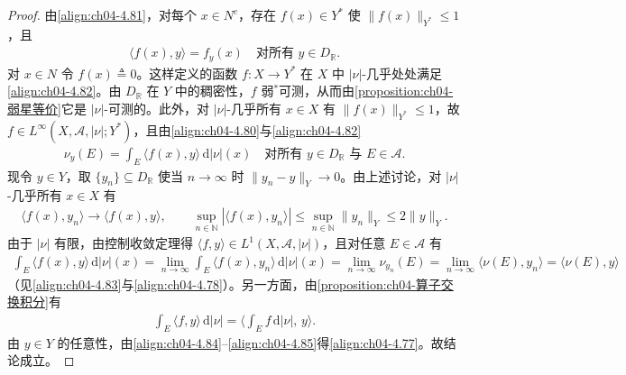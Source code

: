 \documentclass[../../main.tex]{subfiles}%
\begin{document}
\begin{proof}
由\eqref{align:ch04-4.81}，对每个 $x\in N^c$，存在 $f(x)\in Y^*$ 使 $\|f(x)\|_{Y^*}\leqslant1$，且
\begin{align}
\langle f(x),y\rangle=f_y(x)\quad\text{对所有 }y\in D_{\mathbb R}. \label{align:ch04-4.82}
\end{align}
对 $x\in N$ 令 $f(x)\triangleq0$。这样定义的函数 $f:X\to Y^*$ 在 $X$ 中 $|\nu|$-几乎处处满足\eqref{align:ch04-4.82}。由 $D_{\mathbb R}$ 在 $Y$ 中的稠密性，$f$ 弱$^*$可测，从而由\cref{proposition:ch04-弱星等价}它是 $|\nu|$-可测的。此外，对 $|\nu|$-几乎所有 $x\in X$ 有 $\|f(x)\|_{Y^*}\leqslant1$，故 $f\in L^\infty(X,\mathcal{A},|\nu|;Y^*)$，且由\eqref{align:ch04-4.80}与\eqref{align:ch04-4.82}
\begin{align}
\nu_y(E)=\int_E\langle f(x),y\rangle\,\mathrm{d}|\nu|(x)\quad\text{对所有 }y\in D_{\mathbb R}\text{ 与 }E\in\mathcal{A}. \label{align:ch04-4.83}
\end{align}
现令 $y\in Y$，取 $\{y_n\}\subseteq D_{\mathbb R}$ 使当 $n\to\infty$ 时 $\|y_n-y\|_Y\to0$。由上述讨论，对 $|\nu|$-几乎所有 $x\in X$ 有
\begin{align*}
\langle f(x),y_n\rangle\to\langle f(x),y\rangle,\qquad \sup_{n\in\mathbb N}|\langle f(x),y_n\rangle|\leqslant\sup_{n\in\mathbb N}\|y_n\|_Y\leqslant2\|y\|_Y.
\end{align*}
由于 $|\nu|$ 有限，由控制收敛定理得 $\langle f,y\rangle\in L^1(X,\mathcal{A},|\nu|)$，且对任意 $E\in\mathcal{A}$ 有
\begin{align}
\int_E\langle f(x),y\rangle\,\mathrm{d}|\nu|(x)=\lim_{n\to\infty}\int_E\langle f(x),y_n\rangle\,\mathrm{d}|\nu|(x)
=\lim_{n\to\infty}\nu_{y_n}(E)=\lim_{n\to\infty}\langle\nu(E),y_n\rangle=\langle\nu(E),y\rangle \label{align:ch04-4.84}
\end{align}
（见\eqref{align:ch04-4.83}与\eqref{align:ch04-4.78}）。另一方面，由\cref{proposition:ch04-算子交换积分}有
\begin{align}
\int_E\langle f,y\rangle\,\mathrm{d}|\nu|=\Big\langle\int_E f\,\mathrm{d}|\nu|,\,y\Big\rangle. \label{align:ch04-4.85}
\end{align}
由 $y\in Y$ 的任意性，由\eqref{align:ch04-4.84}--\eqref{align:ch04-4.85}得\eqref{align:ch04-4.77}。故结论成立。
\end{proof}
\end{document}
